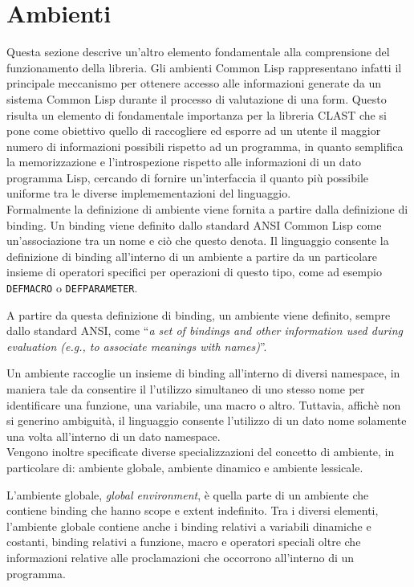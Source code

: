 \section{Ambienti}

Questa sezione descrive un'altro elemento fondamentale alla comprensione del
funzionamento della libreria. Gli ambienti Common Lisp rappresentano infatti
il principale meccanismo per ottenere accesso alle informazioni generate da un
sistema Common Lisp durante il processo di valutazione di una form. Questo
risulta un elemento di fondamentale importanza per la libreria CLAST che si pone
come obiettivo quello di raccogliere ed esporre ad un utente il maggior numero
di informazioni possibili rispetto ad un programma, in quanto semplifica la
memorizzazione e l'introspezione rispetto alle informazioni di un dato programma
Lisp, cercando di fornire un'interfaccia il quanto più possibile uniforme tra le
diverse implemementazioni del linguaggio.\\

Formalmente la definizione di ambiente viene fornita a partire dalla definizione
di binding. Un binding viene definito dallo standard ANSI Common Lisp come
un'associazione tra un nome e ciò che questo denota. Il linguaggio consente la
definizione di binding all'interno di un ambiente a partire da un particolare
insieme di operatori specifici per operazioni di questo tipo, come ad esempio
\texttt{DEFMACRO} o \texttt{DEFPARAMETER}.

A partire da questa definizione di binding, un ambiente viene definito,
sempre dallo standard ANSI, come \enquote{\textit{a set of bindings and other
information used during evaluation (e.g., to associate meanings with names)}}.

Un ambiente raccoglie un insieme di binding all'interno di diversi namespace,
in maniera tale da consentire il l'utilizzo simultaneo di uno stesso nome per
identificare una funzione, una variabile, una macro o altro. Tuttavia, affichè
non si generino ambiguità, il linguaggio consente l'utilizzo di un dato nome
solamente una volta all'interno di un dato namespace.\\

Vengono inoltre specificate diverse specializzazioni del concetto di ambiente,
in particolare di: ambiente globale, ambiente dinamico e ambiente lessicale.

L'ambiente globale, \textit{global environment}, è quella parte di un ambiente
che contiene binding che hanno scope e extent indefinito. Tra i diversi
elementi, l'ambiente globale contiene anche i binding relativi a variabili
dinamiche e costanti, binding relativi a funzione, macro e operatori speciali
oltre che informazioni relative alle proclamazioni che occorrono all'interno di
un programma.

